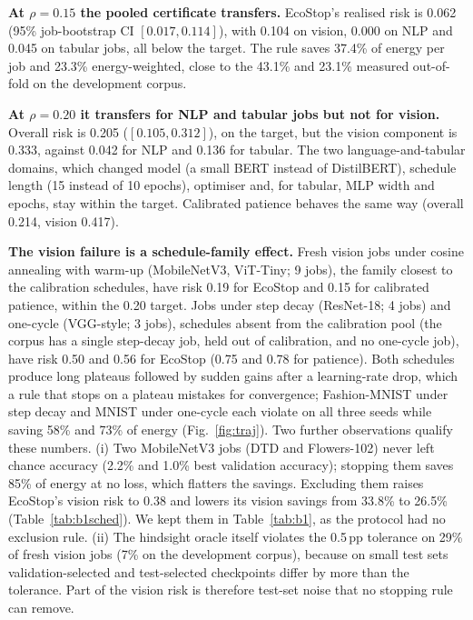 \documentclass[3p,twocolumn,10pt]{elsarticle}
\theoremstyle{definition}
\begin{document}
\textbf{At $\rho=0.15$ the pooled certificate transfers.} EcoStop's realised risk is 0.062 (95\% job-bootstrap CI $[0.017,0.114]$), with 0.104 on vision, 0.000 on NLP and 0.045 on tabular jobs, all below the target. The rule saves 37.4\% of energy per job and 23.3\% energy-weighted, close to the 43.1\% and 23.1\% measured out-of-fold on the development corpus.

\textbf{At $\rho=0.20$ it transfers for NLP and tabular jobs but not for vision.} Overall risk is 0.205 ($[0.105,0.312]$), on the target, but the vision component is 0.333, against 0.042 for NLP and 0.136 for tabular. The two language-and-tabular domains, which changed model (a small BERT instead of DistilBERT), schedule length (15 instead of 10 epochs), optimiser and, for tabular, MLP width and epochs, stay within the target. Calibrated patience behaves the same way (overall 0.214, vision 0.417).

\textbf{The vision failure is a schedule-family effect.} Fresh vision jobs under cosine annealing with warm-up (MobileNetV3, ViT-Tiny; 9 jobs), the family closest to the calibration schedules, have risk 0.19 for EcoStop and 0.15 for calibrated patience, within the 0.20 target. Jobs under step decay (ResNet-18; 4 jobs) and one-cycle (VGG-style; 3 jobs), schedules absent from the calibration pool (the corpus has a single step-decay job, held out of calibration, and no one-cycle job), have risk 0.50 and 0.56 for EcoStop (0.75 and 0.78 for patience). Both schedules produce long plateaus followed by sudden gains after a learning-rate drop, which a rule that stops on a plateau mistakes for convergence; Fashion-MNIST under step decay and MNIST under one-cycle each violate on all three seeds while saving 58\% and 73\% of energy (Fig.~\ref{fig:traj}). Two further observations qualify these numbers. (i) Two MobileNetV3 jobs (DTD and Flowers-102) never left chance accuracy (2.2\% and 1.0\% best validation accuracy); stopping them saves 85\% of energy at no loss, which flatters the savings. Excluding them raises EcoStop's vision risk to 0.38 and lowers its vision savings from 33.8\% to 26.5\% (Table~\ref{tab:b1sched}). We kept them in Table~\ref{tab:b1}, as the protocol had no exclusion rule. (ii) The hindsight oracle itself violates the 0.5\,pp tolerance on 29\% of fresh vision jobs (7\% on the development corpus), because on small test sets validation-selected and test-selected checkpoints differ by more than the tolerance. Part of the vision risk is therefore test-set noise that no stopping rule can remove.
\end{document}
